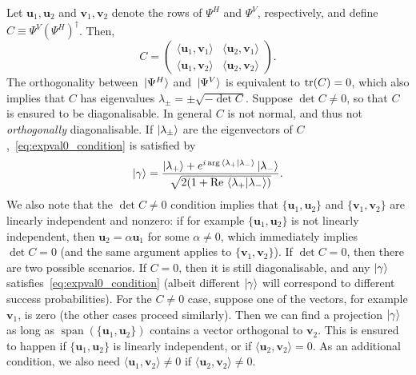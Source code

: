 \documentclass[
	aps, pra, authorblock, superscriptaddress, twocolumn,
	10pt
]{revtex4-1}
\newcommand{\bs}[1]{\boldsymbol{#1}}
\newcommand{\on}[1]{\operatorname{#1}}
\begin{document}
Let $\bs u_1,\bs u_2$ and $\bs v_1,\bs v_2$ denote the rows of $\Psi^H$ and $\Psi^V$, respectively, and define $C\equiv \Psi^V(\Psi^H)^\dagger$. Then,
\begin{equation}
    C =
    \begin{pmatrix}
        \langle \bs u_1, \bs v_1\rangle & \langle \bs u_2, \bs v_1\rangle \\
        \langle \bs u_1, \bs v_2\rangle & \langle \bs u_2, \bs v_2\rangle
    \end{pmatrix}.
\end{equation}
The orthogonality between $\ket*{\Psi^H}$ and $\ket*{\Psi^V}$ is equivalent to $\tr(C)=0$,
which also implies that $C$ has eigenvalues
$\lambda_\pm = \pm\sqrt{-\det C}$.
Suppose $\det C\neq0$, so that $C$ is ensured to be diagonalisable. In general $C$ is not normal, and thus not \emph{orthogonally} diagonalisable.
If $\ket{\lambda_\pm}$ are the eigenvectors of $C$,~\cref{eq:expval0_condition} is satisfied by
\begin{equation}
    \ket\gamma =
    \frac{
        \ket{\lambda_+} +
        e^{i\arg\braket*{\lambda_+}{\lambda_-}} \ket{\lambda_-}
    }{
        \sqrt{2(1+\Re\braket*{\lambda_+}{\lambda_-})}
    }.
\end{equation}
We also note that the $\det C\neq0$ condition implies that $\{\bs u_1, \bs u_2\}$ and $\{\bs v_1, \bs v_2\}$ are linearly independent and nonzero: if for example $\{\bs u_1,\bs u_2\}$ is not linearly independent, then $\bs u_2=\alpha \bs u_1$ for some $\alpha\neq0$, which immediately implies $\det C=0$ (and the same argument applies to $\{\bs v_1,\bs v_2\}$).
If $\det C=0$, then there are two possible scenarios. If $C=0$, then it is still diagonalisable, and any $\ket\gamma$ satisfies~\cref{eq:expval0_condition} (albeit different $\ket\gamma$ will correspond to different success probabilities).
For the $C\neq0$ case,
suppose one of the vectors, for example $\bs v_1$, is zero (the other cases proceed similarly). Then we can find a projection $\ket\gamma$ as long as $\on{span}(\{\bs u_1,\bs u_2\})$ contains a vector orthogonal to $\bs v_2$. This is ensured to happen if $\{\bs u_1,\bs u_2\}$ is linearly independent, or if $\langle\bs u_2,\bs v_2\rangle=0$. As an additional condition, we also need $\langle\bs u_1, \bs v_2\rangle\neq0$ if $\langle \bs u_2,\bs v_2\rangle\neq0$.
\end{document}
